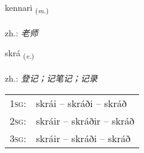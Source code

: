 \documentclass[frontgrid, backgrid]{flacards}\usepackage[]{graphicx}\usepackage[]{xcolor}
\begin{document}
\renewcommand{\blhead}{\vskip5pt {\small\bfseries\footnotesize Nafnorð | 名词 }}
\renewcommand{\bcfoot}{\vskip5pt \hspace{2pt}{\small\bfseries\footnotesize 1K}}


{kennari \small{\textsubscript{(\textit{m.})}} \\[1ex] %
\textphonetic{[cʰɛnarɪ]} \\
zh.: \emph{老师} \\  [2ex]
\renewcommand*{\arraystretch}{0.8}
}

\renewcommand{\flhead}{\vskip5pt \fboxsep=0pt {\small\bfseries\footnotesize Sagnorð | 动词}}
\renewcommand{\fcfoot}{\vskip5pt \fboxsep=0pt \hspace{2pt}{\small\bfseries\footnotesize 1K}}

\renewcommand{\blhead}{\vskip5pt {\small\bfseries\footnotesize Sagnorð | 动词 }}
\renewcommand{\bcfoot}{\vskip5pt \hspace{2pt}{\small\bfseries\footnotesize 1K}}


{skrá \small{\textsubscript{(\textit{v.})}} \\[1ex] %
\textphonetic{[skrauː]} \\
zh.: \emph{登记；记笔记；记录} \\  [2ex]
\renewcommand*{\arraystretch}{0.8}
\begin{tabular}{p{1cm}l}
\textsc{1sg}: & skrái -- skráði -- skráð \\ 
\textsc{2sg}: & skráir -- skráðir -- skráð \\ 
\textsc{3sg}: & skráir -- skráði -- skráð \\ 
\end{tabular}
}

\renewcommand{\flhead}{\vskip5pt \fboxsep=0pt {\small\bfseries\footnotesize Nafnorð | 名词}}
\renewcommand{\fcfoot}{\vskip5pt \fboxsep=0pt \hspace{2pt}{\small\bfseries\footnotesize 1K}}
\end{document}
